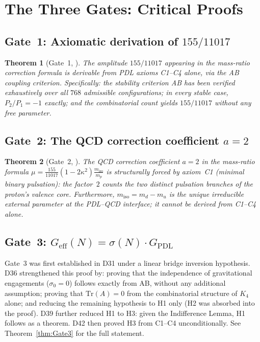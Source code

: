 \documentclass[11pt,a4paper]{article}
\theoremstyle{plain}
\newtheorem{theorem}{Theorem}[section]
\theoremstyle{definition}
\theoremstyle{remark}
\newcommand{\Geff}{G_{\mathrm{eff}}}
\newcommand{\GPDL}{G_{\mathrm{PDL}}}
\newcommand{\sigmaN}{\sigma(N)}
\begin{document}
\section{The Three Gates: Critical Proofs}
\label{sec:gates}

\subsection{Gate~1: Axiomatic derivation of \texorpdfstring{$155/11017$}{155/11017}}
\label{subsec:gate1}
\begin{theorem}[Gate~1, \cite{D29}]
\label{thm:Gate1}
The amplitude $155/11017$ appearing in the mass-ratio correction formula is derivable from PDL axioms C1--C4 alone, via the AB coupling criterion. Specifically: the stability criterion AB has been verified exhaustively over all $768$ admissible configurations; in every stable case, $P_2/P_1=-1$ exactly; and the combinatorial count yields $155/11017$ without any free parameter.
\end{theorem}

\subsection{Gate~2: The QCD correction coefficient \texorpdfstring{$a=2$}{a=2}}
\label{subsec:gate2}
\begin{theorem}[Gate~2, \cite{D30}]
\label{thm:Gate2}
The QCD correction coefficient $a=2$ in the mass-ratio formula $\mu=\frac{155}{11017}(1-2\kappa^2)\frac{m_{\mathrm{iso}}}{m_p}$ is structurally forced by axiom~C1 (minimal binary pulsation): the factor~$2$ counts the two distinct pulsation branches of the proton's valence core. Furthermore, $m_{\mathrm{iso}}=m_d-m_u$ is the unique irreducible external parameter at the PDL--QCD interface; it cannot be derived from C1--C4 alone.
\end{theorem}

\subsection{Gate~3: \texorpdfstring{$\Geff(N)=\sigmaN\cdot\GPDL$}{Geff(N)=sigmaN·GPDL}}
\label{subsec:gate3}
Gate~3 was first established in D31 under a linear bridge inversion hypothesis. D36 strengthened this proof by: proving that the independence of gravitational engagements ($\sigma_0=0$) follows exactly from AB, without any additional assumption; proving that $\mathrm{Tr}(A)=0$ from the combinatorial structure of $K_4$ alone; and reducing the remaining hypothesis to H1 only (H2 was absorbed into the proof). D39 further reduced H1 to H3: given the Indifference Lemma, H1 follows as a theorem. D42 then proved H3 from C1--C4 unconditionally. See Theorem~\ref{thm:Gate3} for the full statement.
\end{document}
